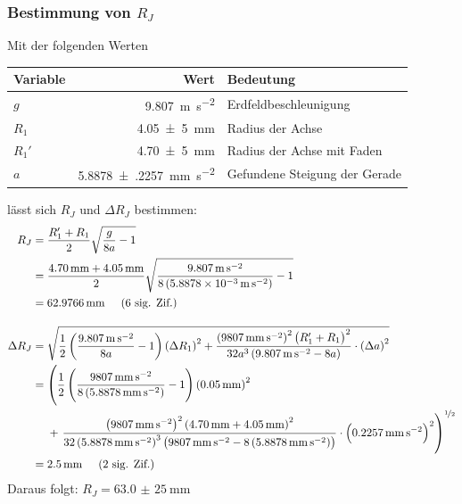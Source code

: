         \subsubsection{Bestimmung von $R_{J}$}
            Mit der folgenden Werten
            \begin{center}
                \begin{tabular}{lrl}
                    \toprule
                    Variable & Wert & Bedeutung \\
                    \midrule
                    $g$ & \SI{9.807}{\meter\per\second\squared} & Erdfeldbeschleunigung \\
                    $R_1$ & \SI{4,05(5)}{\milli\meter} & Radius der Achse \\
                    $R_1'$ & \SI{4,70(5)}{\milli\meter} & Radius der Achse mit Faden \\
                    $a$ & \SI{5.8878(2257)}{\milli\meter\per\second\squared} & Gefundene Steigung der Gerade \\ %
                    \bottomrule
                \end{tabular}
            \end{center}

            lässt sich $R_J$ und $\Delta R_J$ bestimmen:
            \begin{align}
                R_{J} &= \frac{R_1' + R_1}{2}\sqrt{\frac{g}{8a}-1} \notag \\
                &= \frac{\SI{4,70}{\milli\meter} + \SI{4,05}{\milli\meter}}{2}\sqrt{\frac{\SI{9.807}{\meter\per\second\squared}}{8\left(\SI{5.8878e-3}{\meter\per\second\squared}\right)}-1} \notag \\
                &= \SI{62,9766}{\milli\meter} \hspace{0.5cm}\text{(6 sig. Zif.)} \\[1em]
                \Delta R_J &= \sqrt{\frac{1}{2}\left(\frac{\SI{9.807}{\meter\per\second\squared}}{8a} -1\right)\left(\Delta R_1\right)^2 + \frac{\left(\SI{9807}{\milli\meter\per\second\squared}\right)^2\left(R_1' + R_1\right)^2}{32a^3\left(\SI{9.807}{\meter\per\second\squared}-8a\right)}\cdot\left(\Delta a\right)^2} \notag \\
                &= \left(\frac{1}{2}\left(\frac{\SI{9807}{\milli\meter\per\second\squared}}{8\left(\SI{5.8878}{\milli\meter\per\second\squared}\right)} -1\right)\left(\SI{0.05}{\milli\meter}\right)^2 \right. \notag \\
                &~~~~+ \left. \frac{\left(\SI{9807}{\milli\meter\per\second\squared}\right)^2\left(\SI{4,70}{\milli\meter} + \SI{4,05}{\milli\meter}\right)^2}{32\left(\SI{5.8878}{\milli\meter\per\second\squared}\right)^3\left(\SI{9807}{\milli\meter\per\second\squared}-8\left(\SI{5.8878}{\milli\meter\per\second\squared}\right)\right)}\cdot\left(\SI{0,2257}{\milli\meter\per\second\squared}\right)^2\right)^{\nicefrac{1}{2}} \notag \\
                &= \SI{2,5}{\milli\meter} \hspace{0.5cm}\text{(2 sig. Zif.)}
            \end{align} %
            Daraus folgt: $R_J = \SI{63,0(25)}{\milli\meter}$
